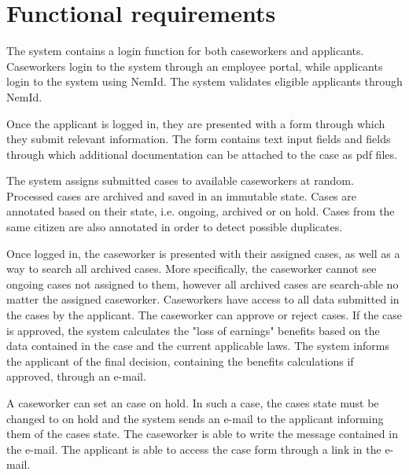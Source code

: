 \newpage
\section{Functional requirements}

The system contains a login function for both caseworkers and applicants. Caseworkers login to the system through an employee portal, while applicants login to the system using NemId. The system validates eligible applicants through NemId.

\vspace{2mm}

Once the applicant is logged in, they are presented with a form through which they submit relevant information. The form contains text input fields and fields through which additional documentation can be attached to the case as pdf files.

\vspace{2mm}

The system assigns submitted cases to available caseworkers at random. Processed cases are archived and saved in an immutable state. Cases are annotated based on their state, i.e. ongoing, archived or on hold. Cases from the same citizen are also annotated in order to detect possible duplicates.

\vspace{2mm}

Once logged in, the caseworker is presented with their assigned cases, as well as a way to search all archived cases. More specifically, the caseworker cannot see ongoing cases not assigned to them, however all archived cases are search-able no matter the assigned caseworker. Caseworkers have access to all data submitted in the cases by the applicant. The caseworker can approve or reject cases. If the case is approved, the system calculates the "loss of earnings" benefits based on the data contained in the case and the current applicable laws. The system informs the applicant of the final decision, containing the benefits calculations if approved, through an e-mail.

\vspace{2mm}

A caseworker can set an case on hold. In such a case, the cases state must be changed to on hold and the system sends an e-mail to the applicant informing them of the cases state. The caseworker is able to write the message contained in the e-mail. The applicant is able to access the case form through a link in the e-mail.

